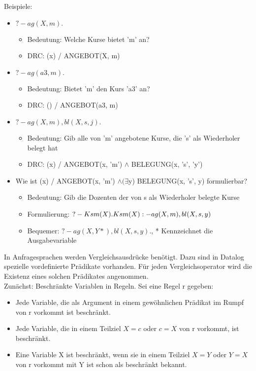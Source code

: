 \documentclass[12pt, a4paper]{article}
\begin{document}
Beispiele:
\begin{itemize}
\item $? - ag(X,m).$
\begin{itemize}
\item Bedeutung: Welche Kurse bietet 'm' an?
\item DRC: (x) / ANGEBOT(X, m) 
\end{itemize}
\item $? - ag(a3,m).$
\begin{itemize}
\item Bedeutung: Bietet 'm' den Kurs 'a3' an?
\item DRC: () / ANGEBOT(a3, m) 
\end{itemize}
\item $? - ag(X,m), bl(X,s,j).$
\begin{itemize}
\item Bedeutung: Gib alle von 'm' angebotene Kurse, die 's' als Wiederholer belegt hat
\item DRC: (x) / ANGEBOT(x, 'm') $\wedge$ BELEGUNG(x, 's', 'y') 
\end{itemize}
\item Wie ist (x) / ANGEBOT(x, 'm') $\wedge (\exists $y) BELEGUNG(x, 's', y) formulierbar?
\begin{itemize}
\item Bedeutung: Gib die Dozenten der von s als Wiederholer belegte Kurse
\item Formulierung: $? - Ksm(X). \\ Ksm(X) :- ag(X, m), bl(X,s,y)$
\item Bequemer: $?- ag(X, Y*), bl(X,s,y).$, * Kennzeichnet die Ausgabevariable
\end{itemize}
\end{itemize}

In Anfragesprachen werden Vergleichsausdrücke benötigt. Dazu sind in Datalog spezielle vordefinierte Prädikate vorhanden. Für jeden Vergleichsoperator wird die Existenz eines solchen Prädikates angenommen.\\
Zunächst: Beschränkte Variablen in Regeln. Sei eine Regel r gegeben:
\begin{itemize}
\item Jede Variable, die als Argument in einem gewöhnlichen Prädikat im Rumpf von r vorkommt ist beschränkt.
\item Jede Variable, die in einem Teilziel $X=c$ oder $c=X$ von r vorkommt, ist beschränkt.
\item Eine Variable X ist beschränkt, wenn sie in einem Teilziel $X=Y$ oder $Y=X$ von r vorkommt mit Y ist schon als beschränkt bekannt.
\end{itemize}
\end{document}
